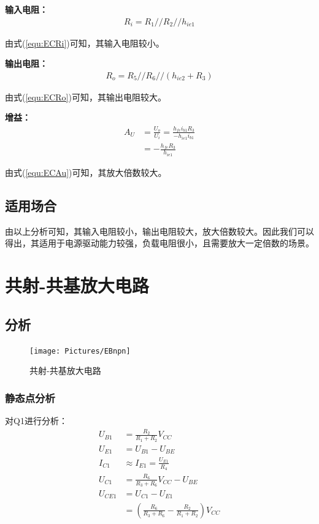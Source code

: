 \documentclass[11pt,a4paper,UTF8]{ctexart}
\begin{document}
			\textbf{输入电阻：}
			\begin{align}
				R_i = R_1//R_2//h_{ie1} \label{equ:ECRi}
			\end{align}
			
			由式(\ref{equ:ECRi})可知，其输入电阻较小。
			
			\textbf{输出电阻：}
			\begin{align}
				R_o = R_5//R_6//(h_{ie2} + R_3) \label{equ:ECRo}
			\end{align}
			
			由式(\ref{equ:ECRo})可知，其输出电阻较大。
			
			\textbf{增益：}
			\begin{align}
				A_U &= \frac{U_o}{U_i} = \frac{h_{fe}i_{b1}R_3}{-h_{ie1}i_{b1}} \nonumber\\
				&= -\frac{h_{fe}R_3}{h_{ie1}} \label{equ:ECAu}
			\end{align}

			由式(\ref{equ:ECAu})可知，其放大倍数较大。

		\subsection{适用场合}
			由以上分析可知，其输入电阻较小，输出电阻较大，放大倍数较大。因此我们可以得出，其适用于电源驱动能力较强，负载电阻很小，且需要放大一定倍数的场景。

	\section{共射-共基放大电路}
		\subsection{分析}
			\begin{figure}[H]
				\centering
				\texttt{[image: Pictures/EBnpn]}
				\caption{共射-共基放大电路}
				\label{fig:ebnpn}
			\end{figure}
			\subsubsection{静态点分析}
			对Q1进行分析：
			\begin{align}
				U_{B1} &= \frac{R_2}{R_1+R_2}V_{CC} \\
				U_{E1} &= U_{B1} - U_{BE} \\
				I_{C1} &\approx I_{E1} = \frac{U_{E1}}{R_4} \\
				U_{C1} &= \frac{R_6}{R_3+R_6}V_{CC} - U_{BE} \\
				U_{CE1} &= U_{C1} - U_{E1} \nonumber\\
				&= (\frac{R_6}{R_3+R_6}-\frac{R_2}{R_1+R_2})V_{CC}
			\end{align}
			
\end{document}
